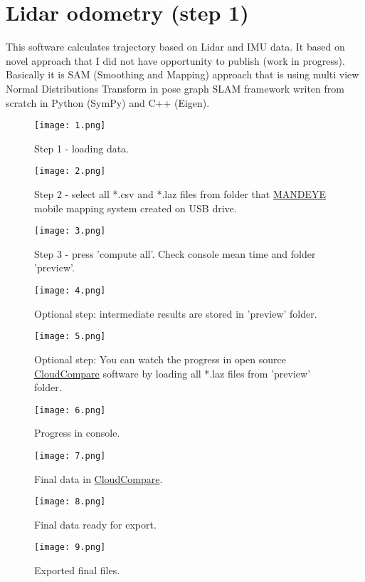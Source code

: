 \chapter{Lidar odometry (step 1)}
This software calculates trajectory based on Lidar and IMU data.
It based on novel approach that I did not have opportunity to publish (work in progress).
Basically it is SAM (Smoothing and Mapping) approach that is using multi view Normal Distributions Transform in pose graph SLAM framework writen from scratch in Python (SymPy) and C++ (Eigen).
 

\begin{figure}
	\centering
	\texttt{[image: 1.png]}
	\caption{Step 1 - loading data.}
	\label{fig:1}
\end{figure}

\begin{figure}
	\centering
	\texttt{[image: 2.png]}
	\caption{Step 2 - select all *.csv and *.laz files from folder that \href{https://github.com/JanuszBedkowski/mandeye_controller/blob/main/doc/manual/manual_v0_1/mandeye_dev_manual_v0_1.pdf}{MANDEYE} mobile mapping system created on USB drive.}
	\label{fig:2}
\end{figure}

\begin{figure}
	\centering
	\texttt{[image: 3.png]}
	\caption{Step 3 - press 'compute all'. Check console mean time and folder 'preview'.}
	\label{fig:3}
\end{figure}

\begin{figure}
	\centering
	\texttt{[image: 4.png]}
	\caption{Optional step: intermediate results are stored in 'preview' folder.}
	\label{fig:4}
\end{figure}

\begin{figure}
	\centering
	\texttt{[image: 5.png]}
	\caption{Optional step: You can watch the progress in open source \href{https://www.cloudcompare.org/}{CloudCompare} software by loading all *.laz files from 'preview' folder.}
	\label{fig:5}
\end{figure}

\begin{figure}
	\centering
	\texttt{[image: 6.png]}
	\caption{Progress in console.}
	\label{fig:6}
\end{figure}

\begin{figure}
	\centering
	\texttt{[image: 7.png]}
	\caption{Final data in \href{https://www.cloudcompare.org/}{CloudCompare}.}
	\label{fig:7}
\end{figure}

\begin{figure}
	\centering
	\texttt{[image: 8.png]}
	\caption{Final data ready for export.}
	\label{fig:8}
\end{figure}

\begin{figure}
	\centering
	\texttt{[image: 9.png]}
	\caption{Exported final files.}
	\label{fig:9}
\end{figure}